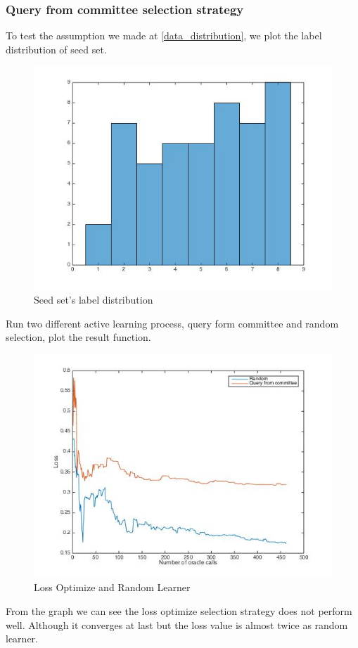 \documentclass{article}
\begin{document}
\subsubsection{Query from committee selection strategy}
To test the assumption we made at \ref{data_distribution}, we plot the label distribution of seed set.
\begin{figure}[H]
\centering
\includegraphics[scale=0.5]{posterior_train_distribution}
\caption{Seed set's label distribution}
\end{figure}

Run two different active learning process, query form committee and random selection, plot the result function.
\begin{figure}[H]
\centering
\includegraphics[scale=0.5]{loss_optimize_vs_random_pool_based}
\caption{Loss Optimize and Random Learner}
\end{figure}
From the graph we can see the loss optimize selection strategy does not perform well. Although it converges at last but the loss value is almost twice as random learner.
\end{document}
